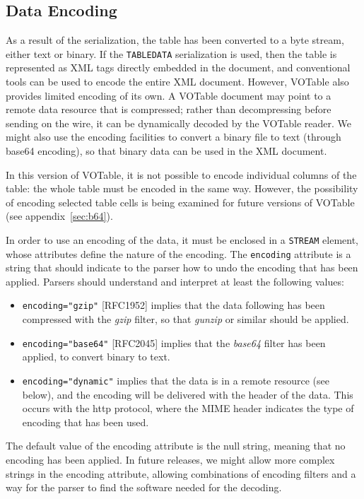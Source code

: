 \documentclass[11pt,a4paper]{ivoa}
\def\Arefx#1{appendix~\ref{#1}}
\let\fg=\color
\def\attr#1{{\tt{\fg{DarkRed}#1}}}
\def\elem#1{{\tt{\fg{DarkRed}#1}}}
\def\attrval#1#2{{\tt{\fg{DarkRed}#1}="{\fg{DarkPurple}#2}"}}
\begin{document}
{\subsection{Data Encoding}
\label{elem:STREAM}

As a result of the serialization, the table has been converted to
a byte stream, either text or binary. If the {\elem{TABLEDATA}}
serialization is used, then the table is represented as XML tags
directly  embedded in the document,
and conventional tools can be used to encode the entire XML document.
However, VOTable also provides limited encoding of its own.
A VOTable document may point to a remote data resource that is compressed;
rather than decompressing before sending on the wire, it can be dynamically
decoded by the VOTable reader. We might also use the encoding facilities to
convert a binary file to text (through base64 encoding), so that binary
data can be used in the XML document.

In this version of VOTable, it is not possible to encode
individual columns of the table: the whole table must be encoded in
the same way. However, the possibility of encoding selected table cells
is  being examined for future versions of VOTable
(see \Arefx{sec:b64}).

In order to use an encoding of the data, it must be enclosed in a
{\elem{STREAM}}
element, whose attributes define the nature of the encoding. The
{\attr{encoding}}
attribute is a string that should indicate to the parser how to undo
the encoding that has been applied. Parsers should understand and
interpret at least the following values:
\begin{itemize}
        \item {\attrval{encoding}{gzip}} [RFC1952]
        implies that the data following has been compressed with the {\em gzip}
        filter, so that {\em gunzip} or similar should be applied.
        \item {\attrval{encoding}{base64}} [RFC2045]
        implies that the {\em base64} filter has been applied, to convert binary
        to text.
        \item {\attrval{encoding}{dynamic}}
        implies that the data is in a remote resource (see below), and the
        encoding will be delivered with the header of the data.
        This occurs with the http protocol, where the MIME header indicates
        the type of encoding that has been used.
\end{itemize}

\noindent The default value of the encoding attribute is the null string,
meaning that no encoding has been
applied. In future releases, we might allow more complex strings in
the encoding attribute, allowing combinations of encoding filters and
a way for the parser to find the software needed for the decoding.

}
\end{document}
